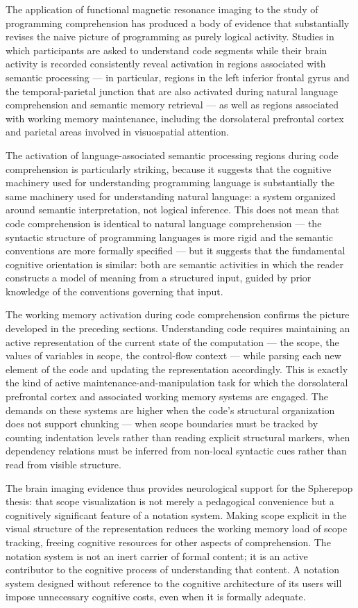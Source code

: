 \documentclass[12pt,openany]{book}
\theoremstyle{plain}
\theoremstyle{definition}
\theoremstyle{remark}
\begin{document}
The application of functional magnetic resonance imaging to the study of programming comprehension has produced a body of evidence that substantially revises the naive picture of programming as purely logical activity. Studies in which participants are asked to understand code segments while their brain activity is recorded consistently reveal activation in regions associated with semantic processing — in particular, regions in the left inferior frontal gyrus and the temporal-parietal junction that are also activated during natural language comprehension and semantic memory retrieval — as well as regions associated with working memory maintenance, including the dorsolateral prefrontal cortex and parietal areas involved in visuospatial attention.

The activation of language-associated semantic processing regions during code comprehension is particularly striking, because it suggests that the cognitive machinery used for understanding programming language is substantially the same machinery used for understanding natural language: a system organized around semantic interpretation, not logical inference. This does not mean that code comprehension is identical to natural language comprehension — the syntactic structure of programming languages is more rigid and the semantic conventions are more formally specified — but it suggests that the fundamental cognitive orientation is similar: both are semantic activities in which the reader constructs a model of meaning from a structured input, guided by prior knowledge of the conventions governing that input.

The working memory activation during code comprehension confirms the picture developed in the preceding sections. Understanding code requires maintaining an active representation of the current state of the computation — the scope, the values of variables in scope, the control-flow context — while parsing each new element of the code and updating the representation accordingly. This is exactly the kind of active maintenance-and-manipulation task for which the dorsolateral prefrontal cortex and associated working memory systems are engaged. The demands on these systems are higher when the code's structural organization does not support chunking — when scope boundaries must be tracked by counting indentation levels rather than reading explicit structural markers, when dependency relations must be inferred from non-local syntactic cues rather than read from visible structure.

The brain imaging evidence thus provides neurological support for the Spherepop thesis: that scope visualization is not merely a pedagogical convenience but a cognitively significant feature of a notation system. Making scope explicit in the visual structure of the representation reduces the working memory load of scope tracking, freeing cognitive resources for other aspects of comprehension. The notation system is not an inert carrier of formal content; it is an active contributor to the cognitive process of understanding that content. A notation system designed without reference to the cognitive architecture of its users will impose unnecessary cognitive costs, even when it is formally adequate.
\end{document}
